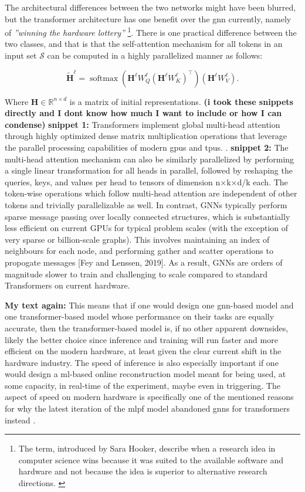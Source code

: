 The architectural differences between the two networks might have been blurred, but the transformer architecture has one benefit over the \gls{gnn} currently, namely of \textit{''winning the hardware lottery''} \footnote{The term, introduced by Sara Hooker, describe when a
research idea in computer science wins because it was suited to the available software and hardware and not because the idea is superior to alternative research directions. \cite{hooker2020hardwarelottery}}. There is one practical difference between the two classes, and that is that 
the self-attention mechanism for all tokens in
an input set $\mathscr{S}$ can be computed in a highly parallelized manner as follows:

\[
\widetilde{\mathbf{H}}^{\ell}
=
\operatorname{softmax}
\left(
\mathbf{H}^{\ell}{W}_{Q}^{\ell}
\left(
\mathbf{H}^{\ell}{W}_{K}^{\ell}
\right)^{\top}
\right)
\left(
\mathbf{H}^{\ell}{W}_{V}^{\ell}
\right).
\]

Where $\mathbf{H} \in \mathbb{R}^{n \times d}$ is a matrix of initial representations. 
\textbf{(i took these snippets directly and I dont know how much I want to include or how I can condense)} 
\textbf{snippet 1:} Transformers implement global multi-head attention through highly optimized dense matrix multiplication operations that leverage the parallel processing capabilities of modern \gls{gpu}s and \gls{tpu}s. \cite{joshi2025transformersgnn}.
\textbf{snippet 2:} The multi-head attention mechanism can also be similarly parallelized by performing a single linear
transformation for all heads in parallel, followed by reshaping the queries, keys, and values per head
to tensors of dimension n×k×d/k each. The token-wise operations which follow multi-head
attention are independent of other tokens and trivially parallelizable as well.
In contrast, GNNs typically perform sparse message passing over locally connected structures, which
is substantially less efficient on current GPUs for typical problem scales (with the exception of very
sparse or billion-scale graphs). This involves maintaining an index of neighbours for each node,
and performing gather and scatter operations to propogate messages [Fey and Lenssen, 2019]. As a
result, GNNs are orders of magnitude slower to train and challenging to scale compared to standard
Transformers on current hardware.

\textbf{My text again:} This means that if one would design one \gls{gnn}-based model and one transformer-based model whose performance on their tasks are equally accurate, then the transformer-based model is, if no other apparent downsides, likely the better choice since inference and training will run faster and more efficient on the modern hardware, at least given the clear current shift in the hardware industry. The speed of inference is also especially important if one would design a \gls{ml}-based online reconstruction model meant for being used, at some capacity, in real-time of the experiment, maybe even in triggering. The aspect of speed on modern hardware is specifically one of the mentioned reasons for why the latest iteration of the \gls{mlpf} model abandoned \gls{gnn}s for transformers instead \cite{pata2026-mlpf}. 



